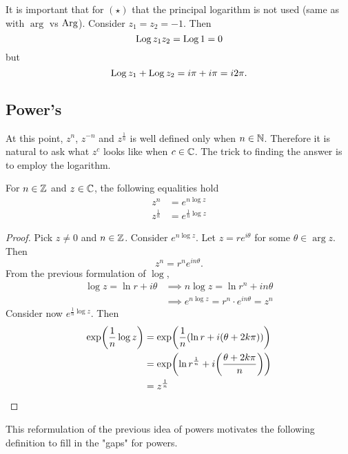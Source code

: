 \documentclass[../notes.tex]{subfiles}
\begin{document}
\begin{remark}
    It is important that for $(\star)$ that the principal logarithm is not used (same as with $\arg$ vs $\operatorname{Arg}$). Consider $z_1 = z_2 = -1$. Then
    \[
        \operatorname{Log} z_1 z_2 = \operatorname{Log} 1 = 0
    \]
    but
    \[
        \operatorname{Log} z_1 + \operatorname{Log} z_2 = i \pi + i \pi = i 2 \pi
    .\]
\end{remark}

\subsection{Power's}

At this point, $z^n$, $z^{-n}$ and $z^{\frac{1}{n}}$ is well defined only when $n \in \mathbb{N}$. Therefore it is natural to ask what $z^c$ looks like when $c \in \mathbb{C}$. The trick to finding the answer is to employ the logarithm.

\begin{theorem}
    For $n \in \mathbb{Z}$ and $z \in \mathbb{C}$, the following equalities hold
    \begin{align*}
        z^n &= e^{n \log z} \\
        z^{\frac{1}{n}} &= e^{\frac{1}{n} \log z}
    \end{align*}
\end{theorem}
\begin{proof}
    Pick $z \neq 0$ and $n \in \mathbb{Z}$. Consider $e^{n \log z}$. Let $z = r e^{i \theta}$ for some $\theta \in \arg z$. Then
    \[
        z^n = r^n e^{in \theta}
    .\]
    From the previous formulation of $\log$,
    \begin{align*}
        \log z = \ln r + i \theta &\implies n \log z = \ln r^n + in \theta \\
                                  &\implies e^{n \log z} = r^n \cdot e^{in \theta} = z^n
    \end{align*}
    Consider now $e^{\frac{1}{n} \log z}$. Then
    \begin{align*}
        \exp(\frac{1}{n} \log z) &= \exp(\frac{1}{n} (\ln r + i(\theta + 2k \pi))) \\
                                 &= \exp(\ln r^{\frac{1}{n}} + i \qty(\frac{\theta + 2k \pi}{n})) \\
                                 &= z^{\frac{1}{n}}
    \end{align*}
\end{proof}

This reformulation of the previous idea of powers motivates the following definition to fill in the "gaps" for powers.
\end{document}
